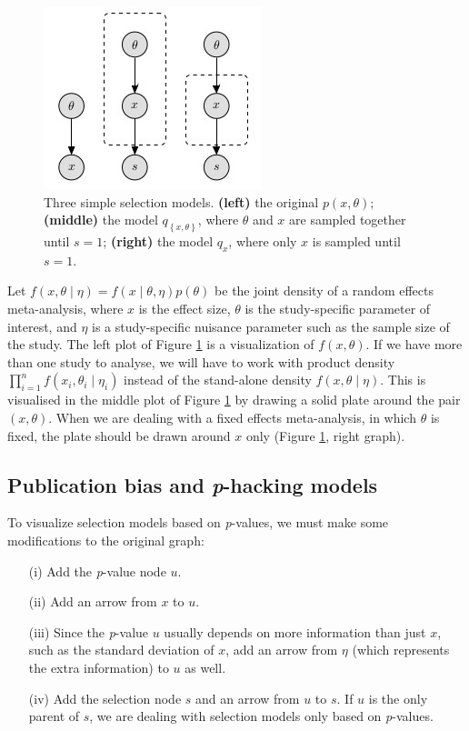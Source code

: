 \documentclass[useAMS,usenatbib,referee]{biom}
\begin{document}
\begin{figure}
\begin{center}     
 \includegraphics{plots/figure_A.jpg}
\end{center}
\caption{\label{fig:Plate notation, simple example} Three simple selection models. {\bf (left)} the original $p(x,\theta)$; {\bf (middle)} the model $q_{\left\{ x,\theta\right\} }$, where $\theta$ and $x$ are
sampled together until $s=1$; {\bf (right)} the model $q_{x}$, where only $x$ is sampled until $s=1$.}
\end{figure}

Let $f(x,\theta\mid\eta)=f(x\mid\theta,\eta)p(\theta)$
be the joint density of a random effects meta-analysis, where $x$ is the effect size, $\theta$ is the study-specific parameter of interest, and $\eta$ is a study-specific nuisance parameter such as the sample size of the study. The left plot of Figure \ref{fig:Plate notation, simple example} is a visualization of $f(x,\theta)$. If we have more than one study to analyse, we will have to work with product density $\prod_{i=1}^{n}f(x_{i},\theta_{i}\mid\eta_{i})$ instead of the stand-alone density $f(x,\theta\mid\eta)$. This is visualised in the middle plot of Figure \ref{fig:Plate notation, simple example}  by drawing a solid plate around the pair $(x,\theta)$. When we are dealing with a fixed effects meta-analysis, in which $\theta$ is fixed, the plate should be drawn around $x$ only (Figure \ref{fig:Plate notation, simple example}, right graph). 


\subsection{Publication bias and \textit{p}-hacking models\label{subsec:Selection sets, meta analysis}}

To visualize selection models based on \textit{p}-values, we must make some modifications to the original graph:

\begin{enumerate}
\item[(i)] Add the \textit{p}-value node $u$.
\item[(ii)] Add an arrow from $x$ to $u$. 
\item[(iii)] Since the \textit{p}-value $u$ usually depends on more information than just $x$, such as the standard deviation of $x$, add an arrow from $\eta$ (which represents the extra information) to $u$ as well.
\item[(iv)] Add the selection node $s$ and an arrow from $u$ to $s$. If $u$ is the only parent of $s$, we are dealing with selection models only based on
\textit{p}-values. 
\end{enumerate}
\end{document}
